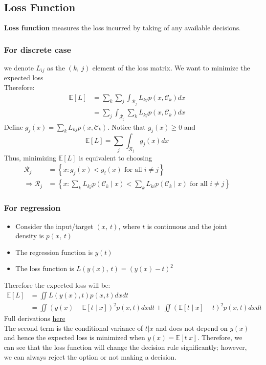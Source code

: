 \subsection*{Loss Function} 
\textbf{Loss function} measures the loss incurred by taking of any available decisions. 
\subsubsection*{For discrete case}
we denote $L_{ij}$ as the $(k,\:j)$ element of the loss matrix. We want to minimize the expected loss\\
Therefore:
\begin{align*}
\mathbb{E}[L] & =\sum_k \sum_j \int_{\mathcal{R}_j} L_{k j} p\left(x, \mathcal{C}_k\right) d x\\
& =\sum_j \int_{\mathcal{R}_j} \sum_k L_{k j} p\left(x, \mathcal{C}_k\right) d x
\end{align*}
Define $g_j(x)=\sum_k L_{k j} p\left(x, \mathcal{C}_k\right)$. Notice that $g_j(x) \geq 0$ and
$$\mathbb{E}[L]=\sum_j \int_{\mathcal{R}_j} g_j(x) d x$$
Thus, minimizing $\mathbb{E}[L]$ is equivalent to choosing
\begin{align}
    \mathcal{R}_j&=\left\{x: g_j(x)<g_i(x) \text { for all } i \neq j\right\}\\
    \Rightarrow \mathcal{R}_j &=\left\{x: \sum_k L_{k j} p\left(\mathcal{C}_k \mid x\right)<\sum_k L_{k i} p\left(\mathcal{C}_k \mid x\right) \text { for all } i \neq j\right\}
\end{align}
\subsubsection*{For regression}
\begin{itemize}
    \item Consider the input/target $(x,\:t)$, where $t$ is continuous and the joint density is $p(x,\:t)$
    \item The regression function is $y(t)$
    \item The loss function is $L(y(x),\:t)=(y(x)-t)^2$
\end{itemize}
Therefore the expected loss will be:
\begin{align*}
\mathbb{E}[L]&=\iint L(y(x), t) p(x, t) d x d t\\
&=\iint(y(x)-\mathbb{E}[t \mid x])^2 p(x, t) d x d t+\iint(\mathbb{E}[t \mid x]-t)^2 p(x, t) d x dt
\end{align*}
Full derivations \hyperref[derivations-1]{here}\\
The second term is the conditional variance of $t|x$ and does not depend on $y(x)$ and hence the expected loss is minimized when $y(x)=\mathbb{E}[t|x]$. Therefore, we can see that the loss function will change the decision rule significantly; however, we can always reject the option or not making a decision.
